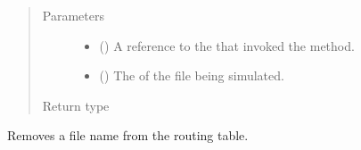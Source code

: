 \documentclass[letterpaper,10pt,english]{sphinxmanual}
\begin{document}
\begin{fulllineitems}
\begin{fulllineitems}
\begin{description}
\end{description}
\begin{quote}\begin{description}
\item[{Parameters}] \leavevmode\begin{itemize}
\item {} 
 ({\hyperref[\detokenize{app:app.type_hints.ClusterType}]{}}) \textendash{} A reference to the
{\hyperref[\detokenize{app.domain:app.domain.cluster_groups.Cluster}]{}} that invoked
the  method.

\item {} 
 () \textendash{} The {\hyperref[\detokenize{app.domain.helpers:app.domain.helpers.smart_dataclasses.FileData.name}]{}}
of the file being simulated.

\end{itemize}

\item[{Return type}] \leavevmode
{}

\end{description}\end{quote}

\end{fulllineitems}


\begin{fulllineitems}
\label{\detokenize{app.domain:app.domain.network_nodes.SGNode.remove_file_routing}}
Removes a file name from the  routing table.


\end{fulllineitems}
\end{fulllineitems}
\end{document}
